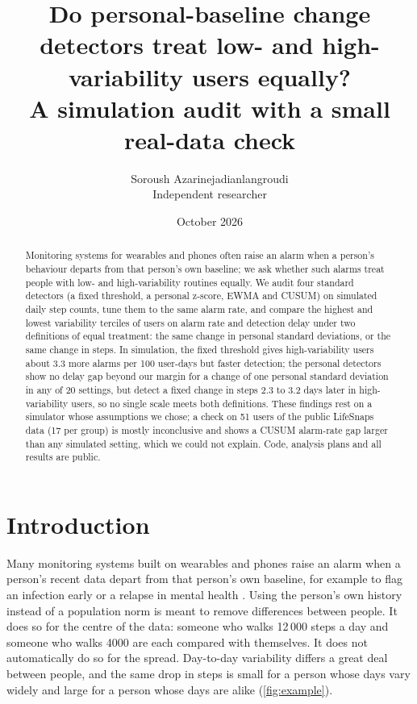 \documentclass[11pt,a4paper]{article}
\title{Do personal-baseline change detectors treat low- and high-variability users equally?\\[2pt]
\large A simulation audit with a small real-data check}
\author{Soroush Azarinejadianlangroudi\\ Independent researcher}
\date{October 2026}
\begin{document}
\maketitle

\begin{abstract}
\noindent Monitoring systems for wearables and phones often raise an alarm when a person's behaviour departs from that person's own baseline; we ask whether such alarms treat people with low- and high-variability routines equally.
We audit four standard detectors (a fixed threshold, a personal z-score, EWMA and CUSUM) on simulated daily step counts, tune them to the same alarm rate, and compare the highest and lowest variability terciles of users on alarm rate and detection delay under two definitions of equal treatment: the same change in personal standard deviations, or the same change in steps.
In simulation, the fixed threshold gives high-variability users about 3.3 more alarms per 100 user-days but faster detection; the personal detectors show no delay gap beyond our margin for a change of one personal standard deviation in any of 20 settings, but detect a fixed change in steps 2.3 to 3.2 days later in high-variability users, so no single scale meets both definitions.
These findings rest on a simulator whose assumptions we chose; a check on 51 users of the public LifeSnaps data (17 per group) is mostly inconclusive and shows a CUSUM alarm-rate gap larger than any simulated setting, which we could not explain.
Code, analysis plans and all results are public.
\end{abstract}

\section{Introduction}
Many monitoring systems built on wearables and phones raise an alarm when a person's recent data depart from that person's own baseline, for example to flag an infection early or a relapse in mental health \citep{mishra2020,alavi2022,cacheda2026,morenomunoz2018}.
Using the person's own history instead of a population norm is meant to remove differences between people.
It does so for the centre of the data: someone who walks 12\,000 steps a day and someone who walks 4000 are each compared with themselves.
It does not automatically do so for the spread.
Day-to-day variability differs a great deal between people, and the same drop in steps is small for a person whose days vary widely and large for a person whose days are alike (\cref{fig:example}).
\end{document}

